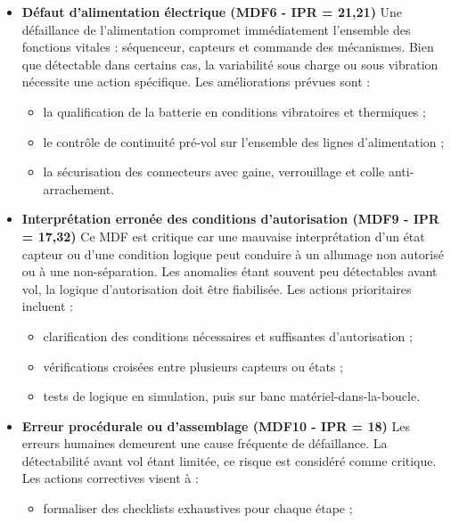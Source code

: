 \begin{itemize}
\begin{itemize}
    \end{itemize}
    \item \textbf{Défaut d’alimentation électrique (MDF6 - IPR = 21,21)} \newline
    Une défaillance de l’alimentation compromet immédiatement l’ensemble des fonctions vitales : séquenceur, capteurs et
    commande des mécanismes. Bien que détectable dans certains cas, la variabilité sous charge ou sous vibration nécessite une
    action spécifique. Les améliorations prévues sont :
    \begin{itemize}
        \item la qualification de la batterie en conditions vibratoires et thermiques ;
        \item le contrôle de continuité pré-vol sur l’ensemble des lignes d’alimentation ;
        \item la sécurisation des connecteurs avec gaine, verrouillage et colle anti-arrachement.\\
    \end{itemize}
    \item \textbf{Interprétation erronée des conditions d’autorisation (MDF9 - IPR = 17,32)} \newline
    Ce MDF est critique car une mauvaise interprétation d’un état capteur ou d’une condition logique peut conduire à un allumage
    non autorisé ou à une non-séparation. Les anomalies étant souvent peu détectables avant vol, la logique d’autorisation doit
    être fiabilisée. Les actions prioritaires incluent :
    \begin{itemize}
        \item clarification des conditions nécessaires et suffisantes d’autorisation ;
        \item vérifications croisées entre plusieurs capteurs ou états ;
        \item tests de logique en simulation, puis sur banc matériel-dans-la-boucle.\\
    \end{itemize}
    \item \textbf{Erreur procédurale ou d’assemblage (MDF10 - IPR = 18)} \newline
    Les erreurs humaines demeurent une cause fréquente de défaillance. La détectabilité avant vol étant limitée, ce risque est
    considéré comme critique. Les actions correctives visent à :
    \begin{itemize}
        \item formaliser des checklists exhaustives pour chaque étape ;

\end{itemize}
\end{itemize}
